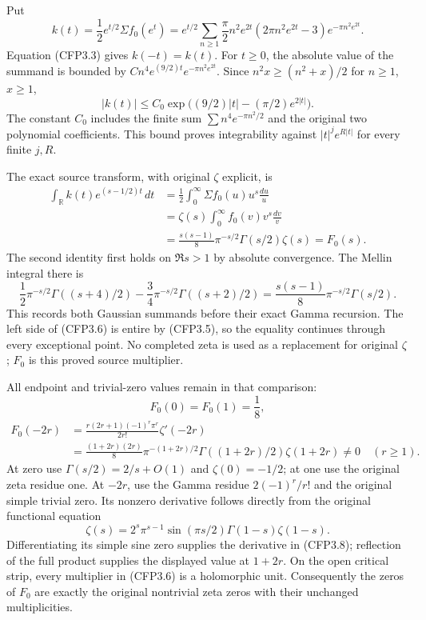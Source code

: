 Put \[
\boxed{k(t)=\frac12e^{t/2}\Sigma f_0(e^t)
=e^{t/2}\sum_{n\ge1}
\frac\pi2 n^2e^{2t}(2\pi n^2e^{2t}-3)
e^{-\pi n^2e^{2t}}.}
\tag{CFP3.4}
\] Equation (CFP3.3) gives \(k(-t)=k(t)\). For \(t\ge0\), the absolute
value of the summand is bounded by
\(C n^4e^{(9/2)t}e^{-\pi n^2e^{2t}}\). Since \(n^2x\ge(n^2+x)/2\) for
\(n\ge1\), \(x\ge1\), \[
|k(t)|\le C_0\exp\bigl((9/2)|t|-(\pi/2)e^{2|t|}\bigr).
\tag{CFP3.5}
\] The constant \(C_0\) includes the finite sum
\(\sum n^4e^{-\pi n^2/2}\) and the original two polynomial coefficients.
This bound proves integrability against \(|t|^j e^{R|t|}\) for every
finite \(j,R\).

The exact source transform, with original \(\zeta\) explicit, is \[
\begin{aligned}
\int_{\mathbb R}k(t)e^{(s-1/2)t}\,dt
&=\frac12\int_0^\infty\Sigma f_0(u)u^s\frac{du}{u}\\
&=\zeta(s)\int_0^\infty f_0(v)v^s\frac{dv}{v}\\
&=\boxed{\frac{s(s-1)}8\pi^{-s/2}\Gamma(s/2)\zeta(s)=F_0(s)}.
\end{aligned}
\tag{CFP3.6}
\] The second identity first holds on \(\Re s>1\) by absolute
convergence. The Mellin integral there is \[
\frac12\pi^{-s/2}\Gamma((s+4)/2)
-\frac34\pi^{-s/2}\Gamma((s+2)/2)
=\frac{s(s-1)}8\pi^{-s/2}\Gamma(s/2).
\tag{CFP3.7}
\] This records both Gaussian summands before their exact Gamma
recursion. The left side of (CFP3.6) is entire by (CFP3.5), so the
equality continues through every exceptional point. No completed zeta is
used as a replacement for original \(\zeta\); \(F_0\) is this proved
source multiplier.

All endpoint and trivial-zero values remain in that comparison: \[
F_0(0)=F_0(1)=\frac18,
\] \[
\begin{aligned}
F_0(-2r)&=\frac{r(2r+1)(-1)^r\pi^r}{2r!}\zeta'(-2r)
\\&=\frac{(1+2r)(2r)}8\pi^{-(1+2r)/2}
\Gamma((1+2r)/2)\zeta(1+2r)\ne0\quad(r\ge1).
\end{aligned}
\tag{CFP3.8}
\] At zero use \(\Gamma(s/2)=2/s+O(1)\) and \(\zeta(0)=-1/2\); at one
use the original zeta residue one. At \(-2r\), use the Gamma residue
\(2(-1)^r/r!\) and the original simple trivial zero. Its nonzero
derivative follows directly from the original functional equation \[
\zeta(s)=2^s\pi^{s-1}\sin(\pi s/2)\Gamma(1-s)\zeta(1-s).
\tag{CFP3.9}
\] Differentiating its simple sine zero supplies the derivative in
(CFP3.8); reflection of the full product supplies the displayed value at
\(1+2r\). On the open critical strip, every multiplier in (CFP3.6) is a
holomorphic unit. Consequently the zeros of \(F_0\) are exactly the
original nontrivial zeta zeros with their unchanged multiplicities.

